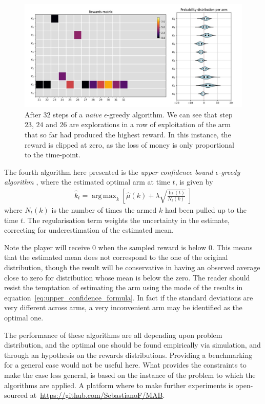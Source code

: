 \documentclass[]{scrartcl}
\DeclareMathOperator*{\argmax}{arg\,max}
\theoremstyle{definition}
\begin{document}
\begin{figure}[h]
    \hspace{-1cm}
    \includegraphics[width=17cm]{figures/step_32.jpg}
    \caption{After $32$ steps of a \emph{naive} $\epsilon$-greedy algorithm. We can see that step $23$, $24$ and $26$ are explorations in a row of exploitation of the arm that so far had produced the highest reward. In this instance, the reward is clipped at zero, as the loss of money is only proportional to the time-point.}
    \label{fig:step_32}
\end{figure}

The fourth algorithm here presented is the \emph{upper confidence bound $\epsilon$-greedy algorithm} \cite{sutton2018reinforcement}, where the estimated optimal arm at time $t$, is given by
\begin{align}\label{eq:upper_confidence_formula}
\hat{k}_t = \argmax_{k} \left[ \hat{\mu}(k) + \lambda \sqrt{ \frac{\ln(t)}{ N_{t}(k) }  } ~\right]
\end{align}
where $N_{t}(k)$ is the number of times the armed $k$ had been pulled up to the time $t$. The regularisation term weights the uncertainty in the estimate, correcting for underestimation of the estimated mean.

Note the player will receive $0$ when the sampled reward is below $0$. This means that the estimated mean does not correspond to the one of the original distribution, though the result will be conservative in having an observed average close to zero for distribution whose mean is below the zero. The reader should resist the temptation of estimating the arm using the mode of the results in equation~\ref{eq:upper_confidence_formula}. In fact if the standard deviations are very different across arms, a very inconvenient arm may be identified as the optimal one.

The performance of these algorithms are all depending upon problem distribution, and the optimal one should be found empirically via simulation, and through an hypothesis on the rewards distributions. Providing a benchmarking for a general case would not be useful here. What provides the constraints to make the case less general, is based on the instance of the problem to which the algorithms are applied. A platform where to make further experiments is open-sourced at~\href{https://github.com/SebastianoF/multi-armed-bandits-testbed}{https://github.com/SebastianoF/MAB}.
\end{document}
